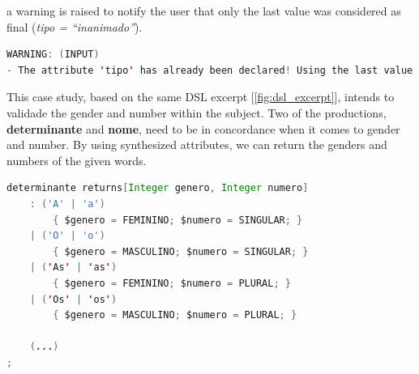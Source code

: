 \noindent a warning is raised to notify the user that only the last value was considered as final (\emph{tipo = ``inanimado''}).

\begin{center}
\begin{minipage}{14cm}
\begin{lstlisting}[language=java, basicstyle=\small, label={lst:meta_input_missing_attr_warn}, caption=Example warning message of same attribute in a single component]
WARNING: (INPUT) 
- The attribute 'tipo' has already been declared! Using the last value found.
\end{lstlisting}
\end{minipage}
\end{center}

This case study, based on the same \textsc{DSL} excerpt [\ref{fig:dsl_excerpt}], intends to validade the gender and number within the subject. Two of the productions, \textbf{determinante} and \textbf{nome}, need to be in concordance when it comes to gender and number. By using synthesized attributes, we can return the genders and numbers of the given words.

\begin{center}
\begin{minipage}{13cm}
\begin{lstlisting}[language=java, basicstyle=\small, label={lst:det_dsl_excerpt}, caption=Excerpt of the ``determinante'' production]
determinante returns[Integer genero, Integer numero]
    : ('A' | 'a')
        { $genero = FEMININO; $numero = SINGULAR; }
    | ('O' | 'o')
        { $genero = MASCULINO; $numero = SINGULAR; }
    | ('As' | 'as')
        { $genero = FEMININO; $numero = PLURAL; }
    | ('Os' | 'os')
        { $genero = MASCULINO; $numero = PLURAL; }

    (...)
;
\end{lstlisting}
\end{minipage}
\end{center}

%

